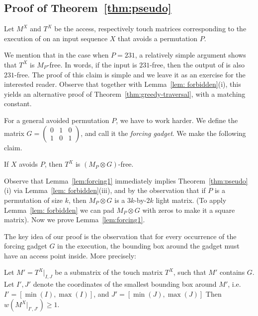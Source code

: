 \fi


\iffalse
\subsection{Proof of Theorem~\ref{thm:pseudo}}
\label{pseudoproof}
Let $M^X$ and $T^X$ be the access, respectively touch matrices corresponding to the execution of \greedy on an input sequence $X$ that avoids a permutation $P$.

We mention that in the case when $P = 231$, a relatively simple argument shows that $T^X$ is $M_P$-free. In words, if the input is $231$-free, then the output of \greedy is also $231$-free. The proof of this claim is simple and we leave it as an exercise for the interested reader. Observe that together with Lemma~\ref{lem: forbidden}(i), this yields an alternative proof of Theorem~\ref{thm:greedy-traversal}, with a matching constant.

For a general avoided permutation $P$, we have to work harder. We define the matrix $G = \left( \begin{matrix}
  0 & 1 & 0 \\
  1 & 0 & 1 
 \end{matrix}\right)$, and call it the \emph{forcing gadget}. We make the following claim.
 \begin{lemma}
 \label{lem:forcing1}
 If $X$ avoids $P$, then $T^X$ is $(M_P \otimes G)$-free.
 \end{lemma}

Observe that Lemma~\ref{lem:forcing1} immediately implies Theorem~\ref{thm:pseudo}(i) via Lemma~\ref{lem: forbidden}(iii), and by the observation that if $P$ is a permutation of size $k$, then $M_P \otimes G$ is a $3k$-by-$2k$ light matrix. (To apply Lemma~\ref{lem: forbidden} we can pad $M_P \otimes G$ with zeros to make it a square matrix). Now we prove Lemma~\ref{lem:forcing1}.

The key idea of our proof is the observation that for every occurrence of the forcing gadget $G$ in the \greedy execution, the bounding box around the gadget must have an access point inside. More precisely:

\begin{lemma}
\label{forcing2}
Let $M' = T^{X}|_{I,J}$ be a submatrix of the touch matrix $T^X$, such that $M'$ contains $G$. Let $I', J'$ denote the coordinates of the smallest bounding box around $M'$, i.e.\ $I' = [\min(I), \max(I)]$, and $J' = [\min(J), \max(J)]$ Then $w(M^{X}|_{I',J'}) \geq 1$.
\end{lemma}


